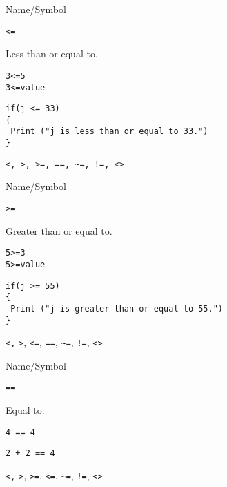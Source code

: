 \begin{desc}{Name/Symbol}

\item[Name/Symbol] 	\verb+<=+                   

\item[Description] 	Less than or equal to.

\item[Usage]
\begin{verbatim}
3<=5  
3<=value
\end{verbatim}

\item[Example]
\begin{verbatim}
if(j <= 33)
{
 Print ("j is less than or equal to 33.")
}
\end{verbatim}
	
\item[See Also]     	\verb+<, >, >=, ==, ~=, !=, <>+

\end{desc}

\rl

\begin{desc}{Name/Symbol}

\item[Name/Symbol] 	\verb+>=+                   

\item[Description] 	Greater than or equal to.

\item[Usage]
\begin{verbatim}
5>=3  
5>=value
\end{verbatim}

\item[Example]
\begin{verbatim}
if(j >= 55)
{
 Print ("j is greater than or equal to 55.")
}
\end{verbatim}

\item[See Also]     	\verb+<,+ \verb+>+, \verb+<=+, \verb+==+, \verb+~=+, \verb+!=+, \verb+<>+
\end{desc}

\rl

\begin{desc}{Name/Symbol}

\item[Name/Symbol] 	\verb+==+                   

\item[Description] 	Equal to.

\item[Usage]       	\verb+4 == 4+
		

\item[Example]
\begin{verbatim}
2 + 2 == 4
\end{verbatim}

\item[See Also]     	\verb+<,+ \verb+>+, \verb+>=+, \verb+<=+, \verb+~=+, \verb+!=+, \verb+<>+
\end{desc}

